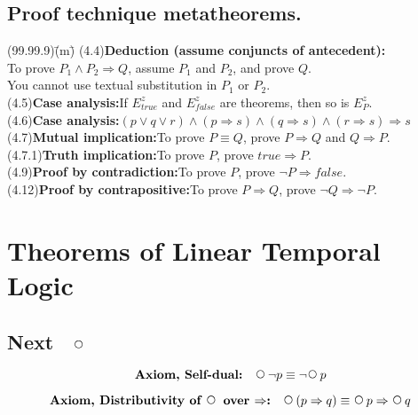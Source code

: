 \documentclass[12pt, fleqn, leqno]{article}
\newcommand{\lgap}{2pt}                             %
\newcommand{\impl}{\ensuremath{\Rightarrow}}        %
\newcommand{\Next}{\;\,\text{\raisebox{3.5pt}{\circle{6}}}}
\newcommand{\firstspacer}{\vspace{-26pt}}
\begin{document}
\subsection*{Proof technique metatheorems.}
\begin{tabbing}
(99.99.9)\;\=(m)\;\=\kill
(4.4)\>\textbf{Deduction (assume conjuncts of antecedent):}\\[\lgap]
      \>To prove $P_{1}\land P_{2}\impl Q$, assume $P_{1}$ and $P_{2}$, and prove $Q$.\\[\lgap]
      \>You cannot use textual substitution in $P_{1}$ or $P_{2}$.\\[\lgap]
(4.5)\>\textbf{Case analysis:}\quad If $E^{z}_{true}$ and $E^{z}_{false}$ are theorems, then so is $E^{z}_{P}$.\\[\lgap]
(4.6)\>\textbf{Case analysis:}\quad $(p\lor q\lor r)\land (p\impl s)\land (q\impl s)\land (r\impl s)\impl s$\\[\lgap]
(4.7)\>\textbf{Mutual implication:}\quad To prove $P\equiv Q$, prove $P\impl Q$ and $Q\impl P$.\\[\lgap]
(4.7.1)\>\textbf{Truth implication:}\quad To prove $P$, prove $true\impl P$.\\[\lgap]
(4.9)\>\textbf{Proof by contradiction:}\quad To prove $P$, prove $\neg P\impl false$.\\[\lgap]
(4.12)\>\textbf{Proof by contrapositive:}\quad To prove $P\impl Q$, prove $\neg Q\impl \neg P$.\\
\end{tabbing}

\section*{Theorems of Linear Temporal Logic}

\subsection*{Next $\quad\Next$}

\begin{equation}\label{E:selfDual}
\textbf{Axiom, Self-dual:}\quad \Next\neg p \equiv \neg\Next p
\end{equation}

\firstspacer

\begin{equation}\label{E:distNextImp}
\textbf{Axiom, Distributivity of $\Next$ over $\impl$:}\quad \Next (p \impl q) \equiv \Next p \impl \Next q
\end{equation}
\end{document}
